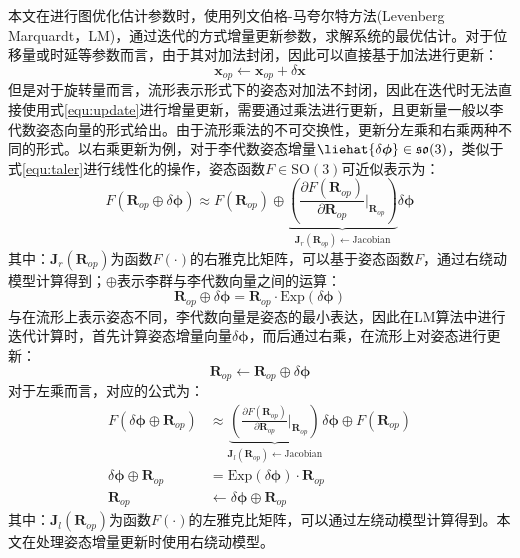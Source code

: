 \section{}
\label{appendix:lie_alg_update}
本文在进行图优化估计参数时，使用列文伯格-马夸尔特方法(Levenberg Marquardt，LM)，通过迭代的方式增量更新参数，求解系统的最优估计。对于位移量或时延等参数而言，由于其对加法封闭，因此可以直接基于加法进行更新：
\begin{equation}
  \label{equ:update}
  \boldsymbol{x}_{op}\gets\boldsymbol{x}_{op}+\delta\boldsymbol{x}
\end{equation}
但是对于旋转量而言，流形表示形式下的姿态对加法不封闭，因此在迭代时无法直接使用式\ref{equ:update}进行增量更新，需要通过乘法进行更新，且更新量一般以李代数姿态向量的形式给出。由于流形乘法的不可交换性，更新分左乘和右乘两种不同的形式。以右乘更新为例，对于李代数姿态增量$\liehat{\delta\boldsymbol{\phi}}\in\mathfrak{so}(3)$，类似于式\ref{equ:taler}进行线性化的操作，姿态函数$F\in\mathrm{SO(3)}$可近似表示为：
\begin{equation}
  F(\boldsymbol{R}_{op}\oplus\delta\boldsymbol{\phi}) \approx
  F(\boldsymbol{R}_{op})\oplus\underbrace{\left( \frac{{\partial F(\boldsymbol{R}_{op})}}{\partial \boldsymbol{R}_{op}}\bigg|_{\boldsymbol{R}_{op}} \right) }_{\boldsymbol{J}_r(\boldsymbol{R}_{op})\gets\mathrm{Jacobian}}\delta\boldsymbol{\phi}
\end{equation}
其中：$\boldsymbol{J}_r(\boldsymbol{R}_{op})$为函数$F(\cdot)$的右雅克比矩阵，可以基于姿态函数$F$，通过右绕动模型计算得到\cite{sola2018micro}；$\oplus$表示李群与李代数向量之间的运算：
\begin{equation}
  \boldsymbol{R}_{op}\oplus\delta\boldsymbol{\phi}=\boldsymbol{R}_{op}\cdot\mathrm{Exp}(\delta\boldsymbol{\phi})
\end{equation}
与在流形上表示姿态不同，李代数向量是姿态的最小表达，因此在LM算法中进行迭代计算时，首先计算姿态增量向量$\delta\boldsymbol{\phi}$，而后通过右乘，在流形上对姿态进行更新：
\begin{equation}
  \boldsymbol{R}_{op}\gets\boldsymbol{R}_{op}\oplus\delta\boldsymbol{\phi}
\end{equation}
对于左乘而言，对应的公式为：
\begin{equation}
  \begin{aligned}
    F(\delta\boldsymbol{\phi}\oplus\boldsymbol{R}_{op}) & \approx
    \underbrace{\left( \frac{{\partial F(\boldsymbol{R}_{op})}}{\partial \boldsymbol{R}_{op}}\bigg|_{\boldsymbol{R}_{op}} \right) }_{\boldsymbol{J}_l(\boldsymbol{R}_{op})\gets\mathrm{Jacobian}}\delta\boldsymbol{\phi}\oplus
    F(\boldsymbol{R}_{op})                                                                                               \\
    \delta\boldsymbol{\phi}\oplus\boldsymbol{R}_{op}    & =\mathrm{Exp}(\delta\boldsymbol{\phi})\cdot\boldsymbol{R}_{op} \\
    \boldsymbol{R}_{op}                                 & \gets\delta\boldsymbol{\phi}\oplus\boldsymbol{R}_{op}
  \end{aligned}
\end{equation}
其中：$\boldsymbol{J}_l(\boldsymbol{R}_{op})$为函数$F(\cdot)$的左雅克比矩阵，可以通过左绕动模型计算得到。本文在处理姿态增量更新时使用右绕动模型。

